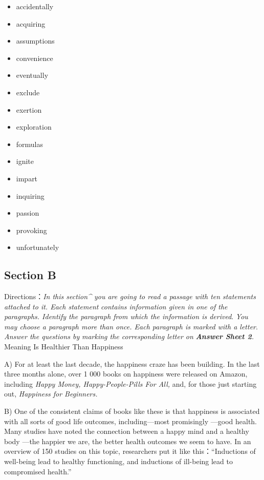 \documentclass[UTF8,11pt]{ctexart}
\begin{document}
\begin{itemize}[leftmargin=2em,itemsep=.2em,topsep=.4em]\item[A.] accidentally
\item[B.] acquiring
\item[C.] assumptions
\item[D.] convenience
\item[E.] eventually
\item[F.] exclude
\item[G.] exertion
\item[H.] exploration
\item[I.] formulas
\item[J.] ignite
\item[K.] impart
\item[L.] inquiring
\item[M.] passion
\item[N.] provoking
\item[O.] unfortunately
\end{itemize}

\subsection*{\textbf{Section B}}


Directions：\textit{In this section\textasciicircum{} you are going to read a passage with ten statements attached to it. Each statement} \textit{contains information given in one of the paragraphs. Identify the paragraph from which the information is derived}. \textit{You may choose a paragraph more than once. Each paragraph is marked with a letter}.\textit{ Answer the questions by} \textit{marking the corresponding letter on}\textbf{\textit{ Answer Sheet 2}}\textit{.} Meaning Is Healthier Than Happiness


A) For at least the last decade, the happiness craze has been building. In the last three months alone, over 1 000 books on happiness were released on Amazon, including\textit{ Happy Money, Happy-People-Pills For All,} and, for those just starting out, \textit{Happiness for Beginners.}


B) One of the consistent claims of books like these is that happiness is associated with all sorts of good life outcomes, including—most promisingly —good health. Many studies have noted the connection between a happy mind and a healthy body —the happier we are, the better health outcomes we seem to have. In an overview of 150 studies on this topic, researchers put it like this：“Inductions of well-being lead to healthy functioning, and inductions of ill-being lead to compromised health.”
\end{document}
